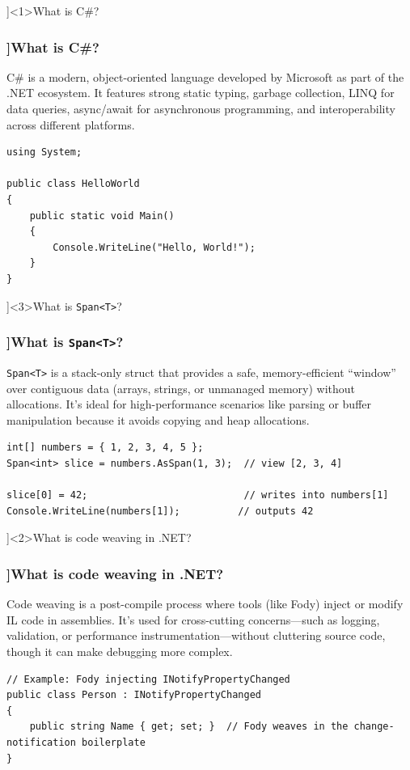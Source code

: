 \QuestionSlide[\CategoryBadge[OOPColor!20]{Language \& Platform}]<1>{What is C\#?}
\begin{frame}[fragile]
  \frametitle{\AnswerTitle[\CategoryBadge[OOPColor!20]{Language \& Platform}]{What is C\#?}}

  {\footnotesize
    C\# is a modern, object-oriented language developed by Microsoft as part of the .NET ecosystem. It features strong static typing, garbage collection, LINQ for data queries, async/await for asynchronous programming, and interoperability across different platforms.
  }

  \begin{verbatim}
using System;

public class HelloWorld
{
    public static void Main()
    {
        Console.WriteLine("Hello, World!");
    }
}
  \end{verbatim}
\end{frame}

\QuestionSlide[\CategoryBadge[PerfColor!20]{Performance}]<3>{What is \texttt{Span<T>}?}
\begin{frame}[fragile]
  \frametitle{\AnswerTitle[\CategoryBadge[PerfColor!20]{Performance}]{What is \texttt{Span<T>}?}}

  {\footnotesize
    \texttt{Span<T>} is a stack-only struct that provides a safe, memory-efficient “window” over contiguous data (arrays, strings, or unmanaged memory) without allocations. It’s ideal for high-performance scenarios like parsing or buffer manipulation because it avoids copying and heap allocations.
  }

  \begin{verbatim}
int[] numbers = { 1, 2, 3, 4, 5 };
Span<int> slice = numbers.AsSpan(1, 3);  // view [2, 3, 4]

slice[0] = 42;                           // writes into numbers[1]
Console.WriteLine(numbers[1]);          // outputs 42
  \end{verbatim}
\end{frame}

\QuestionSlide[\CategoryBadge[MetaColor!20]{Metaprogramming}]<2>{What is code weaving in .NET?}
\begin{frame}[fragile]
  \frametitle{\AnswerTitle[\CategoryBadge[MetaColor!20]{Metaprogramming}]{What is code weaving in .NET?}}

  {\footnotesize
    Code weaving is a post-compile process where tools (like Fody) inject or modify IL code in assemblies. It’s used for cross-cutting concerns—such as logging, validation, or performance instrumentation—without cluttering source code, though it can make debugging more complex.
  }

  \begin{verbatim}
// Example: Fody injecting INotifyPropertyChanged
public class Person : INotifyPropertyChanged
{
    public string Name { get; set; }  // Fody weaves in the change-notification boilerplate
}
  \end{verbatim}
\end{frame}

